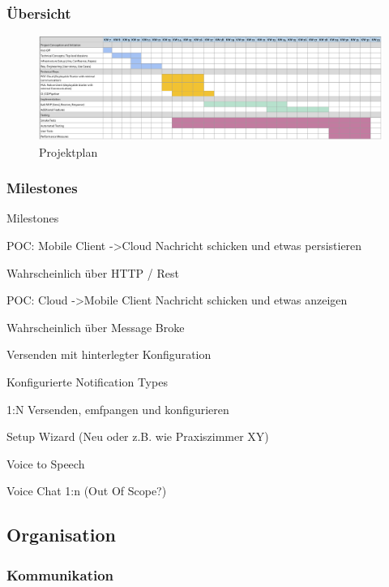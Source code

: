 \subsubsection*{Übersicht}
\begin{figure}[h]
    \label{fig:projectPlan}
    \includegraphics[width=\linewidth]{graphics/Projectplanning}\caption[Projektplan]{Projektplan}
\end{figure}

\subsubsection*{Milestones}

Milestones


POC: Mobile Client -\textgreater Cloud Nachricht schicken und etwas persistieren

Wahrscheinlich über HTTP / Rest


POC: Cloud -\textgreater Mobile Client Nachricht schicken und etwas anzeigen

Wahrscheinlich über Message Broke


Versenden mit hinterlegter Konfiguration


Konfigurierte Notification Types


1:N Versenden, emfpangen und konfigurieren


Setup Wizard (Neu oder z.B. wie Praxiszimmer XY)


Voice to Speech


Voice Chat 1:n (Out Of Scope?)




\clearpage

\subsection{Organisation}\label{subsec:organisation}

\subsubsection*{Kommunikation}

